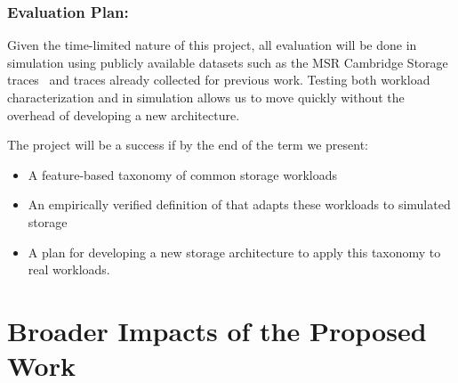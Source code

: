 \subsubsection*{Evaluation Plan: }
Given the time-limited nature of this project, all evaluation will be done in
simulation using publicly available datasets such as the MSR Cambridge Storage
traces~\cite{msrtraces} and traces already collected for previous work.  Testing both
workload characterization and \systemfit in simulation allows us to move quickly
without the overhead of developing a new architecture.  

The project will be a success if by the end of the term we present:
\begin{itemize}
\item A feature-based taxonomy of common storage workloads
\item An empirically verified definition of \systemfit that adapts these
workloads to simulated storage
\item A plan for developing a new storage architecture to apply this taxonomy to
real workloads.
\end{itemize}



\section{Broader Impacts of the Proposed Work}
\label{sec:broader}
